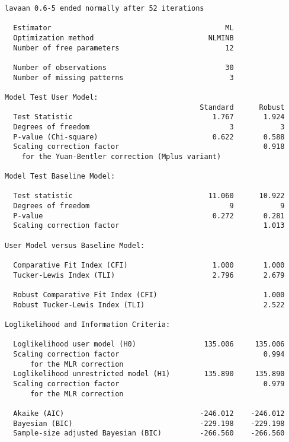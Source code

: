 \begin{verbatim}
lavaan 0.6-5 ended normally after 52 iterations

  Estimator                                         ML
  Optimization method                           NLMINB
  Number of free parameters                         12
                                                      
  Number of observations                            30
  Number of missing patterns                         3
                                                      
Model Test User Model:
                                              Standard      Robust
  Test Statistic                                 1.767       1.924
  Degrees of freedom                                 3           3
  P-value (Chi-square)                           0.622       0.588
  Scaling correction factor                                  0.918
    for the Yuan-Bentler correction (Mplus variant) 

Model Test Baseline Model:

  Test statistic                                11.060      10.922
  Degrees of freedom                                 9           9
  P-value                                        0.272       0.281
  Scaling correction factor                                  1.013

User Model versus Baseline Model:

  Comparative Fit Index (CFI)                    1.000       1.000
  Tucker-Lewis Index (TLI)                       2.796       2.679
                                                                  
  Robust Comparative Fit Index (CFI)                         1.000
  Robust Tucker-Lewis Index (TLI)                            2.522

Loglikelihood and Information Criteria:

  Loglikelihood user model (H0)                135.006     135.006
  Scaling correction factor                                  0.994
      for the MLR correction                                      
  Loglikelihood unrestricted model (H1)        135.890     135.890
  Scaling correction factor                                  0.979
      for the MLR correction                                      
                                                                  
  Akaike (AIC)                                -246.012    -246.012
  Bayesian (BIC)                              -229.198    -229.198
  Sample-size adjusted Bayesian (BIC)         -266.560    -266.560


\end{verbatim}
